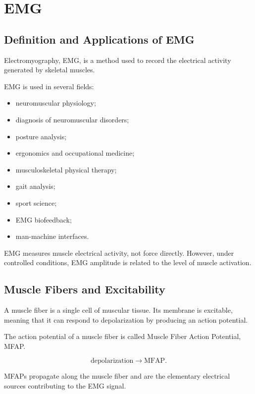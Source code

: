 \section{EMG}

\subsection{Definition and Applications of EMG}

Electromyography, EMG, is a method used to record the electrical activity generated by skeletal muscles.

EMG is used in several fields:

\begin{itemize}[noitemsep]
    \item neuromuscular physiology;
    \item diagnosis of neuromuscular disorders;
    \item posture analysis;
    \item ergonomics and occupational medicine;
    \item musculoskeletal physical therapy;
    \item gait analysis;
    \item sport science;
    \item EMG biofeedback;
    \item man-machine interfaces.
\end{itemize}

\begin{authornote}
EMG measures muscle electrical activity, not force directly. However, under controlled conditions, EMG amplitude is related to the level of muscle activation.
\end{authornote}

\subsection{Muscle Fibers and Excitability}

A muscle fiber is a single cell of muscular tissue. Its membrane is excitable, meaning that it can respond to depolarization by producing an action potential.

The action potential of a muscle fiber is called Muscle Fiber Action Potential, MFAP.

\[
\text{depolarization}
\rightarrow
\text{MFAP}.
\]

MFAPs propagate along the muscle fiber and are the elementary electrical sources contributing to the EMG signal.

